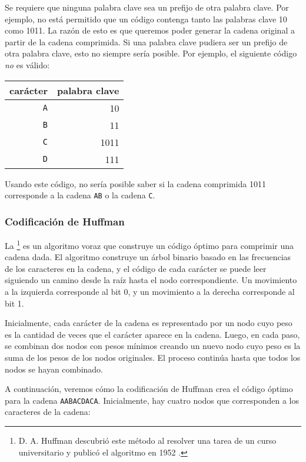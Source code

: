Se requiere que ninguna palabra clave
sea un prefijo de otra palabra clave.
Por ejemplo, no está permitido que un código
contenga tanto las palabras clave 10
como 1011.
La razón de esto es que queremos
poder generar la cadena original
a partir de la cadena comprimida.
Si una palabra clave pudiera ser un prefijo de otra palabra clave,
esto no siempre sería posible.
Por ejemplo, el siguiente código \emph{no} es válido:
\begin{center}
\begin{tabular}{rr}
carácter & palabra clave \\
\hline
\texttt{A} & 10 \\
\texttt{B} & 11 \\
\texttt{C} & 1011 \\
\texttt{D} & 111 \\
\end{tabular}
\end{center}
Usando este código, no sería posible saber
si la cadena comprimida 1011 corresponde a
la cadena \texttt{AB} o la cadena \texttt{C}.


\subsubsection{Codificación de Huffman}

La \footnote{D. A. Huffman descubrió este método
al resolver una tarea de un curso universitario
y publicó el algoritmo en 1952 \cite{huf52}.} es un algoritmo voraz
que construye un código óptimo para
comprimir una cadena dada.
El algoritmo construye un árbol binario
basado en las frecuencias de los caracteres
en la cadena,
y el código de cada carácter se puede leer
siguiendo un camino desde la raíz hasta
el nodo correspondiente.
Un movimiento a la izquierda corresponde al bit 0,
y un movimiento a la derecha corresponde al bit 1.

Inicialmente, cada carácter de la cadena es
representado por un nodo cuyo peso es la
cantidad de veces que el carácter aparece en la cadena.
Luego, en cada paso, se combinan dos nodos con pesos mínimos
creando un nuevo nodo cuyo peso es la suma de los pesos
de los nodos originales.
El proceso continúa hasta que todos los nodos se hayan combinado.

A continuación, veremos cómo la codificación de Huffman crea
el código óptimo para la cadena
\texttt{AABACDACA}.
Inicialmente, hay cuatro nodos que corresponden
a los caracteres de la cadena:

